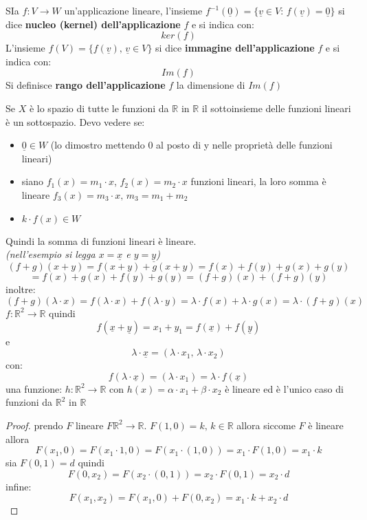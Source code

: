 \documentclass[a4paper,12pt, oneside]{book}
\begin{document}
\newpage
\begin{definizione}
SIa $f:V\rightarrow W$ un'applicazione lineare, l'insieme $f^{-1}(\underline{0})=\{\underline{v}\in V:\, f(\underline{v})=\underline{0}\}$ si dice \textbf{nucleo (kernel) dell'applicazione} $f$ e si indica con:
$$ker(f)$$
L'insieme $f(V)=\{f(\underline{v}),\, \underline{v}\in V\}$ si dice \textbf{immagine dell'applicazione} $f$ e si indica con:
$$Im(f)$$
Si definisce \textbf{rango dell'applicazione} $f$ la dimensione di $Im(f)$
\end{definizione}
Se $X$ è lo spazio di tutte le funzioni da $\mathbb{R}$ in $\mathbb{R}$  il sottoinsieme delle funzioni lineari è un sottospazio. Devo vedere se:
\begin{itemize}
\item $\underline{0}\in W$ (lo dimostro mettendo 0 al posto di y nelle proprietà delle funzioni lineari)
\item siano $f_1(x)=m_1\cdot x$, $f_2(x)=m_2\cdot x$ funzioni lineari, la loro somma è lineare $f_3(x)=m_3\cdot x,\, m_3=m_1+m_2$
\item $k\cdot f(x)\in W$
\end{itemize}
Quindi la somma di funzioni lineari è lineare.\\
\textit{(nell'esempio si legga $x=\underline{x}$ e $y=\underline{y}$)}
$$(f+g)(x+y)=f(x+y)+g(x+y)=f(x)+f(y)+g(x)+g(y)$$$$=f(x)+g(x)+f(y)+g(y)=(f+g)(x)+(f+g)(y)$$
inoltre:
$$(f+g)(\lambda\cdot x)=f(\lambda\cdot x)+f(\lambda\cdot y)=\lambda\cdot f(x)+\lambda\cdot g(x)= \lambda\cdot(f+g)(x)$$
$f:\mathbb{R}^2\rightarrow \mathbb{R}$ quindi $$f(\underline{x}+\underline{y})=x_1+y_1=f(\underline{x})+f(\underline{y})$$
e $$\lambda\cdot\underline{x}=(\lambda\cdot x_1,\,\lambda\cdot x_2)$$
con: $$f(\lambda\cdot\underline{x})=(\lambda\cdot x_1)=\lambda\cdot f(\underline{x})$$
una funzione: $h:\mathbb{R}^2\rightarrow \mathbb{R}$ con $h(x)=\alpha\cdot x_1+\beta\cdot x_2$ è lineare ed è l'unico caso di funzioni da $\mathbb{R}^2$ in $\mathbb{R}$
\begin{proof}
prendo $F$ lineare $F\mathbb{R}^2\rightarrow \mathbb{R}$. $F(1,0)=k,\, k\in\mathbb{R}$ allora siccome $F$ è lineare allora $$F(x_1,0)=F(x_1\cdot 1, 0)=F(x_1\cdot (1,0))=x_1\cdot F(1,0)=x_1\cdot k$$
sia $F(0,1)=d$ quindi $$F(0,x_2)=F(x_2\cdot(0,1))=x_2\cdot F(0,1)=x_2\cdot d$$
infine:
$$F(x_1,x_2)=F(x_1,0)+F(0,x_2)=x_1\cdot k+x_2\cdot d$$
\end{proof}
\end{document}
